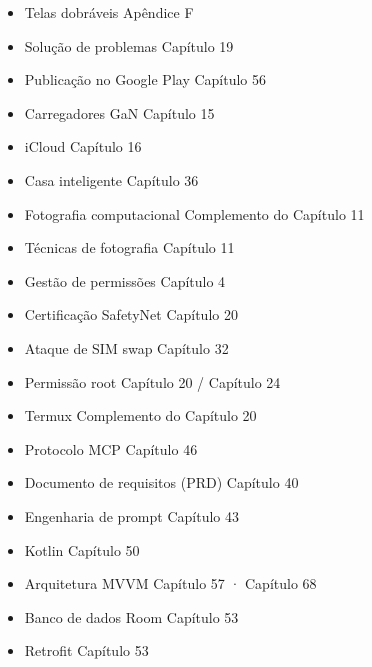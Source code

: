 
\begin{itemize}
  \item Telas dobráveis Apêndice F
  \item Solução de problemas Capítulo 19
  \item Publicação no Google Play Capítulo 56
  \item Carregadores GaN Capítulo 15
  \item iCloud Capítulo 16
  \item Casa inteligente Capítulo 36
  \item Fotografia computacional Complemento do Capítulo 11
\end{itemize}


\begin{itemize}
  \item Técnicas de fotografia Capítulo 11
  \item Gestão de permissões Capítulo 4
  \item Certificação SafetyNet Capítulo 20
  \item Ataque de SIM swap Capítulo 32
  \item Permissão root Capítulo 20 / Capítulo 24
  \item Termux Complemento do Capítulo 20
  \item Protocolo MCP Capítulo 46
  \item Documento de requisitos (PRD) Capítulo 40
  \item Engenharia de prompt Capítulo 43
  \item Kotlin Capítulo 50
  \item Arquitetura MVVM Capítulo 57 · Capítulo 68
  \item Banco de dados Room Capítulo 53
  \item Retrofit Capítulo 53
\end{itemize}


